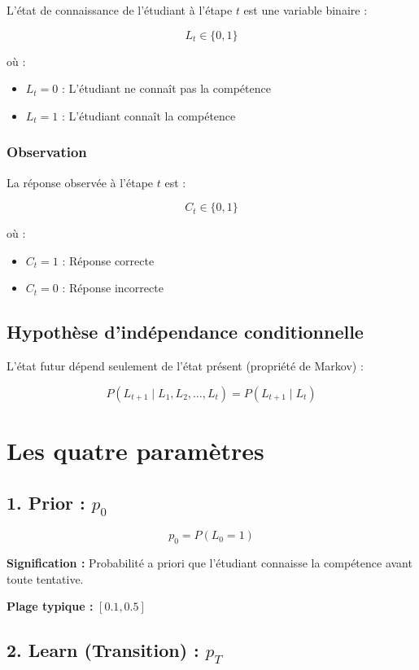 \documentclass[12pt]{article}
\begin{document}
L'état de connaissance de l'étudiant à l'étape $t$ est une variable binaire :

$$L_t \in \{0, 1\}$$

où :
\begin{itemize}
    \item $L_t = 0$ : L'étudiant ne connaît pas la compétence
    \item $L_t = 1$ : L'étudiant connaît la compétence
\end{itemize}

\subsubsection{Observation}

La réponse observée à l'étape $t$ est :

$$C_t \in \{0, 1\}$$

où :
\begin{itemize}
    \item $C_t = 1$ : Réponse correcte
    \item $C_t = 0$ : Réponse incorrecte
\end{itemize}

\subsection{Hypothèse d'indépendance conditionnelle}

L'état futur dépend seulement de l'état présent (propriété de Markov) :

$$P(L_{t+1} \mid L_1, L_2, \ldots, L_t) = P(L_{t+1} \mid L_t)$$

\section{Les quatre paramètres}

\subsection{1. Prior : $p_0$}

$$p_0 = P(L_0 = 1)$$

\textbf{Signification :} Probabilité a priori que l'étudiant connaisse la compétence avant toute tentative.

\textbf{Plage typique :} $[0.1, 0.5]$

\subsection{2. Learn (Transition) : $p_T$}
\end{document}
